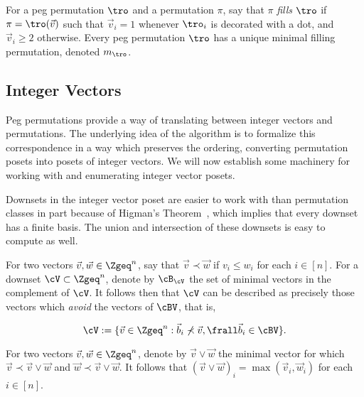 \documentclass[12pt,twoside]{memoir}
\begin{document}
      \begin{definition} \label{polyclass:def:fillingperm}
        For a peg permutation $\tro$ and a permutation $\pi$, say that $\pi$
        \emph{fills} $\tro$ if $\pi = \tro(\vec v)$ such that $\vec v_i = 1$
        whenever $\tro_i$ is decorated with a dot, and $\vec v_i \geq 2$
        otherwise. Every peg permutation $\tro$ has a unique minimal filling
        permutation, denoted $m_{\tro}$. 
      \end{definition}

      



    \subsection{Integer Vectors}

      Peg permutations provide a way of translating between integer vectors and
      permutations. The underlying idea of the algorithm is to formalize this
      correspondence in a way which preserves the ordering, converting permutation
      posets into posets of integer vectors. We will now establish some machinery
      for working with and enumerating integer vector posets.

      Downsets in the integer vector poset are easier to work with than permutation
      classes in part because of Higman's Theorem~\cite{HigmansThm}, which
      implies that every downset has a finite basis. The union and intersection
      of these downsets is easy to compute as well. 

      \begin{definition} \label{polyclass:def:vecposet}
        For two vectors $\vec v, \vec w \in \Zgeq^n$, say that $\vec v \prec \vec
        w$ if $v_i \leq w_i$ for each $i \in [n]$.  For a downset $\cV \subset
        \Zgeq^n$, denote by $\cB_\cV$ the set of minimal vectors in the
        complement of $\cV$. It follows then that $\cV$ can be described as
        precisely those vectors which \emph{avoid} the vectors of $\cBV$, that
        is, 

        $$ \cV := \{ \vec v \in \Zgeq^n : \vec b_i \not \prec \vec v, \frall
            \vec b_i \in \cBV \}. $$

        For two vectors $\vec v, \vec w \in \Zgeq^n$, denote by $\vec v \vee \vec
        w$ the minimal vector for which $\vec v \prec \vec v \vee \vec w$ and $\vec
        w \prec \vec v \vee \vec w$. It follows that $ (\vec v \vee \vec w)_i =
        \max(\vec v_i, \vec w_i)$ for each $i \in [n]$. 
      \end{definition}
\end{document}
